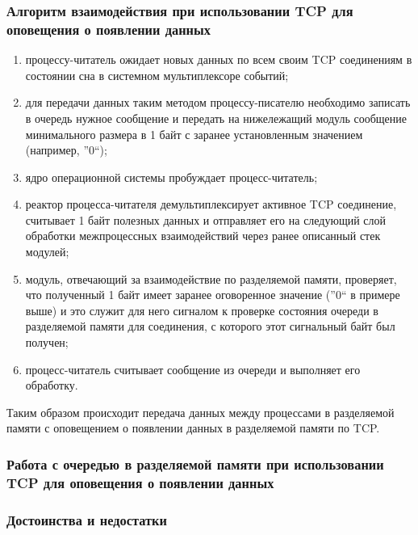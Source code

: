 \subsubsection{Алгоритм взаимодействия при использовании TCP для оповещения о появлении данных}


\begin{enumerate}
\item процессу-читатель ожидает новых данных по всем своим TCP соединениям в состоянии сна в системном мультиплексоре событий;
\item для передачи данных таким методом процессу-писателю необходимо записать в очередь нужное сообщение и передать на нижележащий модуль сообщение минимального размера в 1 байт с заранее установленным значением (например, ''0``);
\item ядро операционной системы пробуждает процесс-читатель;
\item реактор процесса-читателя демультиплексирует активное TCP соединение, считывает 1 байт полезных данных и отправляет его на следующий слой обработки межпроцессных взаимодействий через ранее описанный стек модулей;
\item модуль, отвечающий за взаимодействие по разделяемой памяти, проверяет, что полученный 1 байт имеет заранее оговоренное значение (''0`` в примере выше) и это служит для него сигналом к проверке состояния очереди в разделяемой памяти для соединения, с которого этот сигнальный байт был получен;
\item процесс-читатель считывает сообщение из очереди и выполняет его обработку.
\end{enumerate}

Таким образом происходит передача данных между процессами в разделяемой памяти с оповещением о появлении данных в разделяемой памяти по TCP.

\subsubsection{Работа с очередью в разделяемой памяти при использовании TCP для оповещения о появлении данных}\label{chapter31:SharedMemoryOptimization}


\subsubsection{Достоинства и недостатки}

